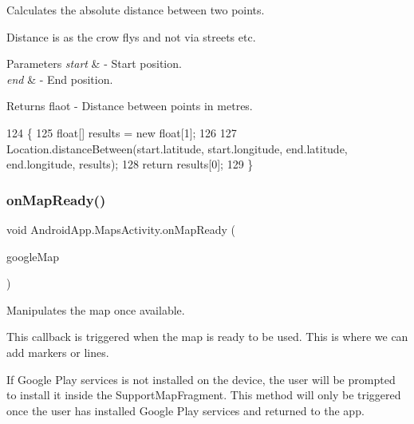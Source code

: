 Calculates the absolute distance between two points. 

Distance is as the crow flys and not via streets etc. 
\begin{DoxyParams}{Parameters}
{\em start} & -\/ Start position. \\
\hline
{\em end} & -\/ End position. \\
\hline
\end{DoxyParams}
\begin{DoxyReturn}{Returns}
flaot -\/ Distance between points in metres. 
\end{DoxyReturn}

\begin{DoxyCode}
124     \{
125         \textcolor{keywordtype}{float}[] results = \textcolor{keyword}{new} \textcolor{keywordtype}{float}[1];
126 
127         Location.distanceBetween(start.latitude, start.longitude, end.latitude, end.longitude, results);
128         \textcolor{keywordflow}{return} results[0];
129     \}
\end{DoxyCode}
\mbox{\label{class_android_app_1_1_maps_activity_abee115dd67628da8e1140430428ce112}} 
\subsubsection{\texorpdfstring{on\+Map\+Ready()}{onMapReady()}}
{\footnotesize\ttfamily void Android\+App.\+Maps\+Activity.\+on\+Map\+Ready (\begin{DoxyParamCaption}\item[{Google\+Map}]{google\+Map }\end{DoxyParamCaption})\hspace{0.3cm}{\ttfamily [inline]}}



Manipulates the map once available. 

This callback is triggered when the map is ready to be used. This is where we can add markers or lines.

If Google Play services is not installed on the device, the user will be prompted to install it inside the Support\+Map\+Fragment. This method will only be triggered once the user has installed Google Play services and returned to the app.


